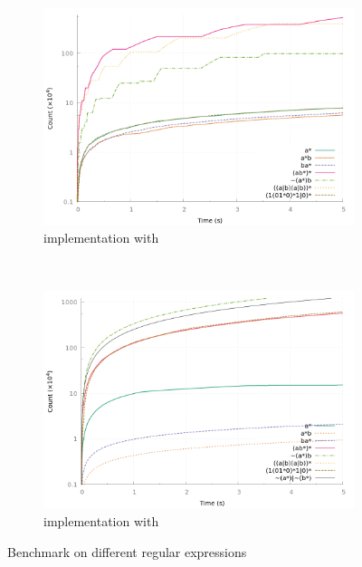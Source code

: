 \begin{figure}[h]
  \centering
  \begin{subfigure}{0.5\linewidth}
    \includegraphics[width=\linewidth]{measure/haskell_langs.png}
    \caption{\haskell implementation with }
    \label{bench:haskell:langs}
  \end{subfigure}~
  \begin{subfigure}{0.5\linewidth}
    \includegraphics[width=\linewidth]{measure/ocaml_langs.png}
    \caption{\ocaml implementation with }
    \label{bench:ocaml:langs}
  \end{subfigure}
  \caption{Benchmark on different regular expressions}
  \label{bench:langs}
\end{figure}

